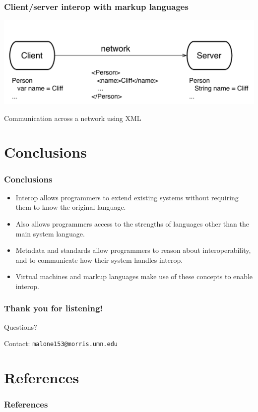 \documentclass{beamer}
\newcommand{\linespace}{\vskip 0.25cm}
\begin{document}
 \begin{frame}
 \frametitle{Client/server interop with markup languages}
 \includegraphics[scale=0.6]{graphics/ClientServer.pdf}
 
 Communication across a network using XML
 
 \end{frame}

\section[Conclusions]{Conclusions}

\begin{frame}
  \frametitle{Conclusions}
  \begin{itemize}
  	\item Interop allows programmers to extend existing systems without requiring them to know the original language.
  	\item Also allows programmers access to the strengths of languages other than the main system language.
	\item Metadata and standards allow programmers to reason about interoperability, and to communicate how their system handles interop.
	\item Virtual machines and markup languages make use of these concepts to enable interop.
  \end{itemize}
\end{frame}




\begin{frame}
	\frametitle{Thank you for listening!}
	
	
		

	\linespace
	\linespace
	\linespace
	
	\begin{center}
	{\huge Questions?}
	\end{center}
	
    \linespace
	\linespace
	\linespace
	
	Contact:  
		\texttt{malone153@morris.umn.edu}
\end{frame}

\section*{References}

\begin{frame} 
	\frametitle{References} 
	
	
	
	
\end{frame} 
\end{document}
